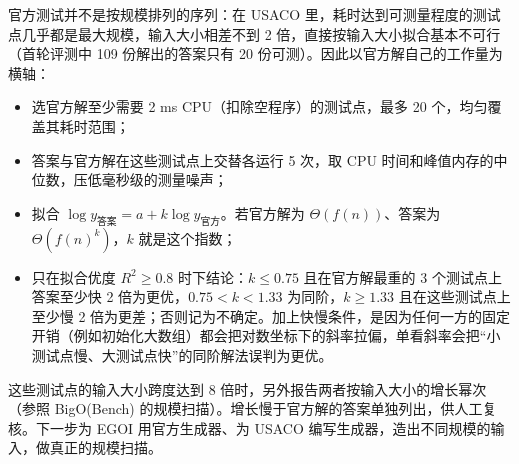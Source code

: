 \documentclass[11pt,a4paper,fontset=none]{ctexart}
\begin{document}
官方测试并不是按规模排列的序列：在 USACO 里，耗时达到可测量程度的测试点几乎都是最大规模，输入大小相差不到 2 倍，直接按输入大小拟合基本不可行（首轮评测中 109 份解出的答案只有 20 份可测）。因此以官方解自己的工作量为横轴：
\begin{itemize}
  \item 选官方解至少需要 2 ms CPU（扣除空程序）的测试点，最多 20 个，均匀覆盖其耗时范围；
  \item 答案与官方解在这些测试点上交替各运行 5 次，取 CPU 时间和峰值内存的中位数，压低毫秒级的测量噪声；
  \item 拟合 $\log y_{\text{答案}} = a + k \log y_{\text{官方}}$。若官方解为 $\Theta(f(n))$、答案为 $\Theta(f(n)^k)$，$k$ 就是这个指数；
  \item 只在拟合优度 $R^2 \ge 0.8$ 时下结论：$k \le 0.75$ 且在官方解最重的 3 个测试点上答案至少快 2 倍为更优，$0.75 < k < 1.33$ 为同阶，$k \ge 1.33$ 且在这些测试点上至少慢 2 倍为更差；否则记为不确定。加上快慢条件，是因为任何一方的固定开销（例如初始化大数组）都会把对数坐标下的斜率拉偏，单看斜率会把“小测试点慢、大测试点快”的同阶解法误判为更优。
\end{itemize}
这些测试点的输入大小跨度达到 8 倍时，另外报告两者按输入大小的增长幂次（参照 BigO(Bench)\cite{bigo} 的规模扫描）。增长慢于官方解的答案单独列出，供人工复核。下一步为 EGOI 用官方生成器、为 USACO 编写生成器，造出不同规模的输入，做真正的规模扫描。


\end{document}
